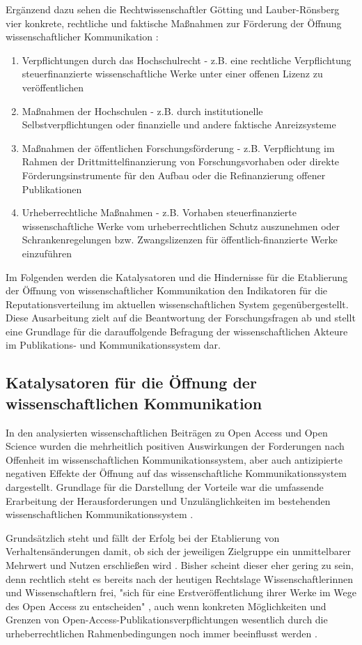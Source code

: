 Ergänzend dazu sehen die Rechtwissenschaftler Götting und Lauber-Rönsberg vier konkrete, rechtliche und faktische Maßnahmen zur Förderung der Öffnung wissenschaftlicher Kommunikation \cite{Goetting_2015}:
\begin{enumerate}
\item Verpflichtungen durch das Hochschulrecht - z.B. eine rechtliche Verpflichtung steuerfinanzierte wissenschaftliche Werke unter einer offenen Lizenz zu veröffentlichen
\item Maßnahmen der Hochschulen - z.B. durch institutionelle Selbstverpflichtungen oder finanzielle und andere faktische Anreizsysteme
\item Maßnahmen der öffentlichen Forschungsförderung - z.B. Verpflichtung im Rahmen der Drittmittelfinanzierung von Forschungsvorhaben oder direkte Förderungsinstrumente für den Aufbau oder die Refinanzierung offener Publikationen
\item Urheberrechtliche Maßnahmen - z.B.  Vorhaben steuerfinanzierte wissenschaftliche Werke vom urheberrechtlichen Schutz auszunehmen oder Schrankenregelungen bzw. Zwangslizenzen für öffentlich-finanzierte Werke einzuführen
\end{enumerate}

Im Folgenden werden die Katalysatoren und die Hindernisse für die Etablierung der Öffnung von wissenschaftlicher Kommunikation den Indikatoren für die Reputationsverteilung im aktuellen wissenschaftlichen System gegenübergestellt. Diese Ausarbeitung zielt auf die Beantwortung der Forschungsfragen ab und stellt eine Grundlage für die darauffolgende Befragung der wissenschaftlichen Akteure im Publikations- und Kommunikationssystem dar.

\subsection{Katalysatoren für die Öffnung der wissenschaftlichen Kommunikation}

In den analysierten wissenschaftlichen Beiträgen zu Open Access und Open Science wurden die mehrheitlich positiven Auswirkungen der Forderungen nach Offenheit im wissenschaftlichen Kommunikationssystem, aber auch antizipierte negativen Effekte der Öffnung auf das wissenschaftliche Kommunikationssystem dargestellt. Grundlage für die Darstellung der Vorteile war die umfassende Erarbeitung der Herausforderungen und Unzulänglichkeiten im bestehenden wissenschaftlichen Kommunikationssystem \cite{cite:17}.

Grundsätzlich steht und fällt der Erfolg bei der Etablierung von Verhaltensänderungen damit, ob sich der jeweiligen Zielgruppe ein unmittelbarer Mehrwert und Nutzen erschließen wird \cite{schulze_2013_open}. Bisher scheint dieser eher gering zu sein, denn rechtlich steht es bereits nach der heutigen Rechtslage Wissenschaftlerinnen und Wissenschaftlern frei, "sich für eine Erstveröffentlichung ihrer Werke im Wege des Open Access zu entscheiden" \cite[:146]{Goetting_2015}, auch wenn konkreten Möglichkeiten und Grenzen von Open-Access-Publikationsverpflichtungen wesentlich durch die urheberrechtlichen Rahmenbedingungen noch immer beeinflusst werden \cite[:211]{Fehling_2014}.

